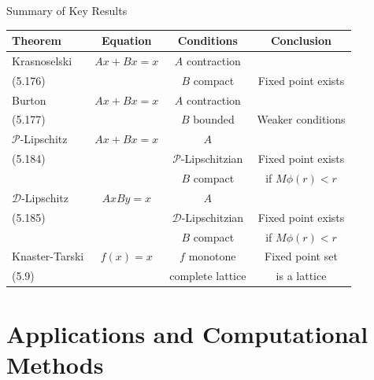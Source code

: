 \documentclass[aspectratio=169,10pt]{beamer}
\begin{document}
\begin{frame}{Summary of Key Results}
    \begin{table}[h]
        \centering
        \small
        \begin{tabular}{|l|c|c|c|}
            \hline
            \textbf{Theorem} & \textbf{Equation} & \textbf{Conditions} & \textbf{Conclusion} \\
            \hline
            Krasnoselski & $Ax + Bx = x$ & $A$ contraction & \\
            (5.176) & & $B$ compact & Fixed point exists \\
            \hline
            Burton & $Ax + Bx = x$ & $A$ contraction & \\
            (5.177) & & $B$ bounded & Weaker conditions \\
            \hline
            $\mathcal{P}$-Lipschitz & $Ax + Bx = x$ & $A$ & \\
            (5.184) & & $\mathcal{P}$-Lipschitzian & Fixed point exists \\
            & & $B$ compact & if $M\phi(r) < r$ \\
            \hline
            $\mathcal{D}$-Lipschitz & $Ax By = x$ & $A$ & \\
            (5.185) & & $\mathcal{D}$-Lipschitzian & Fixed point exists \\
            & & $B$ compact & if $M\phi(r) < r$ \\
            \hline
            Knaster-Tarski & $f(x) = x$ & $f$ monotone & Fixed point set \\
            (5.9) & & complete lattice & is a lattice \\
            \hline
        \end{tabular}
    \end{table}
\end{frame}

\section{Applications and Computational Methods}
\end{document}
